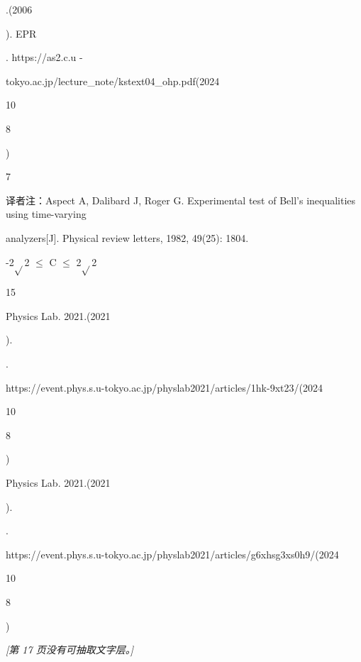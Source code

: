 .(2006\par
). EPR\par
. https://as2.c.u -\par
tokyo.ac.jp/lecture\_note/kstext04\_ohp.pdf(2024\par
10\par
8\par
)\par
7\par
译者注：Aspect A, Dalibard J, Roger G. Experimental test of Bell's inequalities using time-varying\par
analyzers[J]. Physical review letters, 1982, 49(25): 1804.\par
-2$\sqrt{}$2 $\leq$ C $\leq$ 2$\sqrt{}$2\par

15\par
[3] Physics Lab. 2021.(2021\par
).\par
.\par
https://event.phys.s.u-tokyo.ac.jp/physlab2021/articles/1hk-9xt23/(2024\par
10\par
8\par
)\par
[4] Physics Lab. 2021.(2021\par
).\par
.\par
https://event.phys.s.u-tokyo.ac.jp/physlab2021/articles/g6xhsg3xs0h9/(2024\par
10\par
8\par
)\par

\noindent\textit{[第 17 页没有可抽取文字层。]}\par

